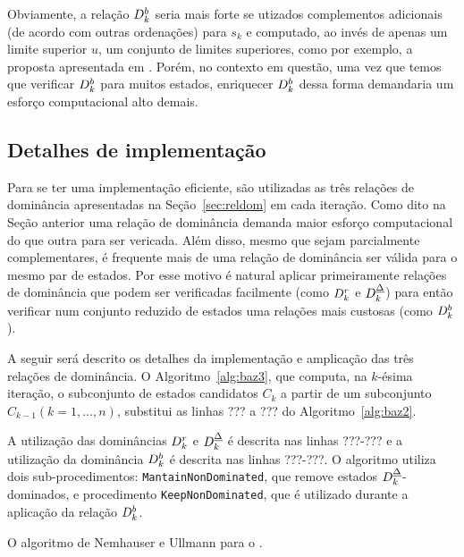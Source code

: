 Obviamente, a relação $D_k^{b}$ seria mais forte se utizados complementos
adicionais (de acordo com outras ordenações) para $s_k$ e computado,
ao invés de apenas um limite superior $u$, um conjunto de limites superiores,
como por exemplo, a proposta apresentada em \cite{ehrgott2007bound}.
Porém, no contexto em questão, uma vez que temos que verificar $D_k^{b}$
para muitos estados, enriquecer $D_k^{b}$ dessa forma demandaria um
esforço computacional alto demais.

\subsection{Detalhes de implementação}

Para se ter uma implementação eficiente, são utilizadas as três relações de
dominância apresentadas na Seção~\ref{sec:reldom} em cada iteração.
Como dito na Seção anterior uma relação de dominância demanda maior
esforço computacional do que outra para ser vericada.
Além disso, mesmo que sejam parcialmente complementares,
é frequente mais de uma relação de dominância ser válida para o mesmo par de estados.
Por esse motivo é natural aplicar primeiramente relações de dominância que
podem ser verificadas facilmente (como $D_k^r$ e $D_k^{\underline{\Delta}}$)
para então verificar num conjunto reduzido de estados uma relações mais
custosas (como $D_k^{b}$).

A seguir será descrito os detalhes da implementação e amplicação
das três relações de dominância.
O Algoritmo~\ref{alg:baz3}, que computa, na $k$-ésima iteração, o subconjunto
de estados candidatos $C_k$ a partir de um subconjunto
$C_{k-1} (k = 1, \ldots, n)$, substitui as linhas ??? a ??? do Algoritmo~\ref{alg:baz2}.

A utilização das dominâncias $D_k^r$ e $D_k^{\underline{\Delta}}$ é descrita nas linhas ???-???
e a utilização da dominância $D_k^{b}$ é descrita nas linhas ???-???.
O algoritmo utiliza dois sub-procedimentos: \texttt{MantainNonDominated},
que remove estados $D_k^{\underline{\Delta}}$-dominados, e procedimento \texttt{KeepNonDominated},
que é utilizado durante a aplicação da relação $D_k^{b}$.

\begin{algorithm}
  \caption{O algoritmo de Nemhauser e Ullmann para o \mokp.}
  \label{alg:baz3}
  
\end{algorithm}






